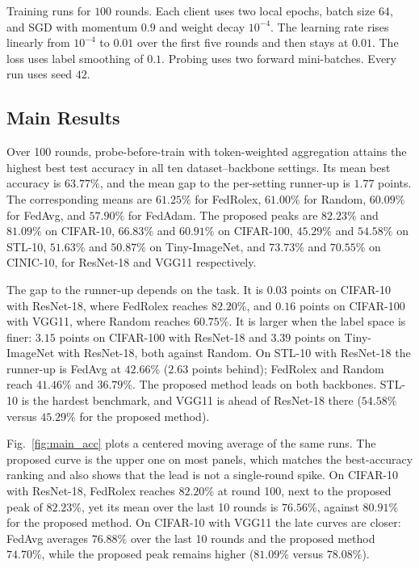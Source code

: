 Training runs for $100$ rounds. Each client uses two local epochs, batch size $64$, and SGD with momentum $0.9$ and weight decay $10^{-4}$. The learning rate rises linearly from $10^{-4}$ to $0.01$ over the first five rounds and then stays at $0.01$. The loss uses label smoothing of $0.1$. Probing uses two forward mini-batches. Every run uses seed $42$.

\subsection{Main Results}

Over 100 rounds, probe-before-train with token-weighted aggregation attains the highest best test accuracy in all ten dataset--backbone settings. Its mean best accuracy is $63.77\%$, and the mean gap to the per-setting runner-up is $1.77$ points. The corresponding means are $61.25\%$ for FedRolex, $61.00\%$ for Random, $60.09\%$ for FedAvg, and $57.90\%$ for FedAdam. The proposed peaks are $82.23\%$ and $81.09\%$ on CIFAR-10, $66.83\%$ and $60.91\%$ on CIFAR-100, $45.29\%$ and $54.58\%$ on STL-10, $51.63\%$ and $50.87\%$ on Tiny-ImageNet, and $73.73\%$ and $70.55\%$ on CINIC-10, for ResNet-18 and VGG11 respectively.

The gap to the runner-up depends on the task. It is $0.03$ points on CIFAR-10 with ResNet-18, where FedRolex reaches $82.20\%$, and $0.16$ points on CIFAR-100 with VGG11, where Random reaches $60.75\%$. It is larger when the label space is finer: $3.15$ points on CIFAR-100 with ResNet-18 and $3.39$ points on Tiny-ImageNet with ResNet-18, both against Random. On STL-10 with ResNet-18 the runner-up is FedAvg at $42.66\%$ ($2.63$ points behind); FedRolex and Random reach $41.46\%$ and $36.79\%$. The proposed method leads on both backbones. STL-10 is the hardest benchmark, and VGG11 is ahead of ResNet-18 there ($54.58\%$ versus $45.29\%$ for the proposed method).

Fig.~\ref{fig:main_acc} plots a centered moving average of the same runs. The proposed curve is the upper one on most panels, which matches the best-accuracy ranking and also shows that the lead is not a single-round spike. On CIFAR-10 with ResNet-18, FedRolex reaches $82.20\%$ at round 100, next to the proposed peak of $82.23\%$, yet its mean over the last 10 rounds is $76.56\%$, against $80.91\%$ for the proposed method. On CIFAR-10 with VGG11 the late curves are closer: FedAvg averages $76.88\%$ over the last 10 rounds and the proposed method $74.70\%$, while the proposed peak remains higher ($81.09\%$ versus $78.08\%$).

